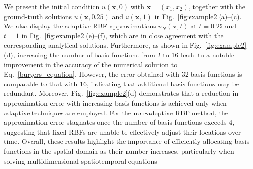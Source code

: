 \begin{example}
We present the initial condition $u(\bm{x},0)$ with $\bm{x}=(x_1,x_2)$, together with the ground-truth solutions $u(\bm{x},0.25)$ and $u(\bm{x},1)$ in Fig.~\ref{fig:example2}(a)–(c). We also display the adaptive RBF approximations $u_N(\bm{x},t)$ at $t=0.25$ and $t=1$ in Fig.~\ref{fig:example2}(e)–(f), which are in close agreement with the corresponding analytical solutions. Furthermore, as shown in Fig.~\ref{fig:example2}(d), increasing the number of basis functions from 2 to 16 leads to a notable improvement in the accuracy of the numerical solution to Eq.~\eqref{burgers_equation}. However, the error obtained with 32 basis functions is comparable to that with 16, indicating that additional basis functions may be redundant. Moreover, Fig.~\ref{fig:example2}(d) demonstrates that a reduction in approximation error with increasing basis functions is achieved only when adaptive techniques are employed. For the non-adaptive RBF method, the approximation error stagnates once the number of basis functions exceeds 4, suggesting that fixed RBFs are unable to effectively adjust their locations over time. Overall, these results highlight the importance of efficiently allocating basis functions in the spatial domain as their number increases, particularly when solving multidimensional spatiotemporal equations.
\end{example}



